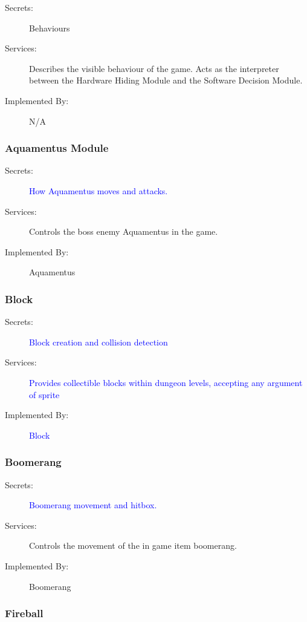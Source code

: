 \documentclass[12pt, titlepage]{article}
\begin{document}
\begin{description}
\item[Secrets:] Behaviours
\item[Services:] Describes the visible behaviour of the game. Acts as the interpreter between the Hardware Hiding Module and the Software Decision Module.
\item[Implemented By:] N/A
\end{description}

\subsubsection{Aquamentus Module}

\begin{description}
\item[Secrets:] \textcolor{blue}{How Aquamentus moves and attacks.}
\item[Services:] Controls the boss enemy Aquamentus in the game.
\item[Implemented By:] Aquamentus
\end{description}

\subsubsection{Block}

\begin{description}
	\item[Secrets:] \textcolor{blue}{Block creation and collision detection}
	\item[Services:] \textcolor{blue}{Provides collectible blocks within dungeon levels, accepting any argument of sprite}
	\item[Implemented By:] \textcolor{blue}{Block}
\end{description}

\subsubsection{Boomerang}

\begin{description}
  \item[Secrets:] \textcolor{blue}{Boomerang movement and hitbox.}
  \item[Services:] Controls the movement of the in game item boomerang.
  \item[Implemented By:] Boomerang
  \end{description}

\subsubsection{Fireball}
\end{document}
